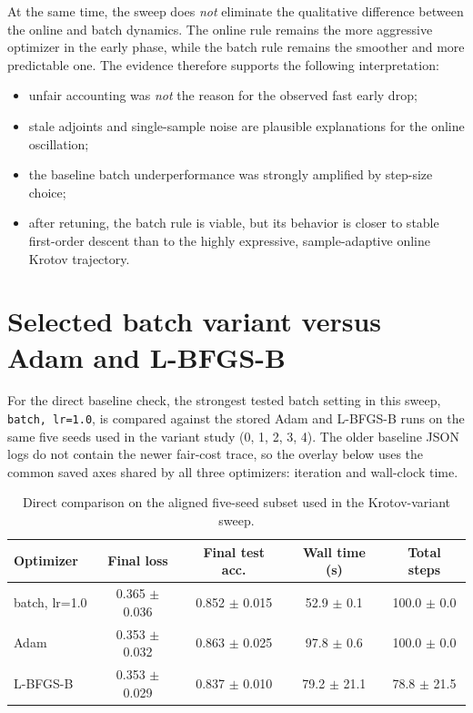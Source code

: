 \documentclass[11pt]{article}
\begin{document}
At the same time, the sweep does \emph{not} eliminate the qualitative difference between the online and batch dynamics. The online rule remains the more aggressive optimizer in the early phase, while the batch rule remains the smoother and more predictable one. The evidence therefore supports the following interpretation:
\begin{itemize}
\item unfair accounting was \emph{not} the reason for the observed fast early drop;
\item stale adjoints and single-sample noise are plausible explanations for the online oscillation;
\item the baseline batch underperformance was strongly amplified by step-size choice;
\item after retuning, the batch rule is viable, but its behavior is closer to stable first-order descent than to the highly expressive, sample-adaptive online Krotov trajectory.
\end{itemize}

\section*{Selected batch variant versus Adam and L-BFGS-B}
For the direct baseline check, the strongest tested batch setting in this sweep, \texttt{batch, lr=1.0}, is compared against the stored Adam and L-BFGS-B runs on the same five seeds used in the variant study (0, 1, 2, 3, 4). The older baseline JSON logs do not contain the newer fair-cost trace, so the overlay below uses the common saved axes shared by all three optimizers: iteration and wall-clock time.

\begin{table}[H]
\centering
\begin{tabular}{lcccc}
\toprule
Optimizer & Final loss & Final test acc. & Wall time (s) & Total steps \\
\midrule
batch, lr=1.0 & 0.365 $\pm$ 0.036 & 0.852 $\pm$ 0.015 & 52.9 $\pm$ 0.1 & 100.0 $\pm$ 0.0 \\
Adam & 0.353 $\pm$ 0.032 & 0.863 $\pm$ 0.025 & 97.8 $\pm$ 0.6 & 100.0 $\pm$ 0.0 \\
L-BFGS-B & 0.353 $\pm$ 0.029 & 0.837 $\pm$ 0.010 & 79.2 $\pm$ 21.1 & 78.8 $\pm$ 21.5 \\
\bottomrule
\end{tabular}
\caption{Direct comparison on the aligned five-seed subset used in the Krotov-variant sweep.}
\end{table}
\end{document}
